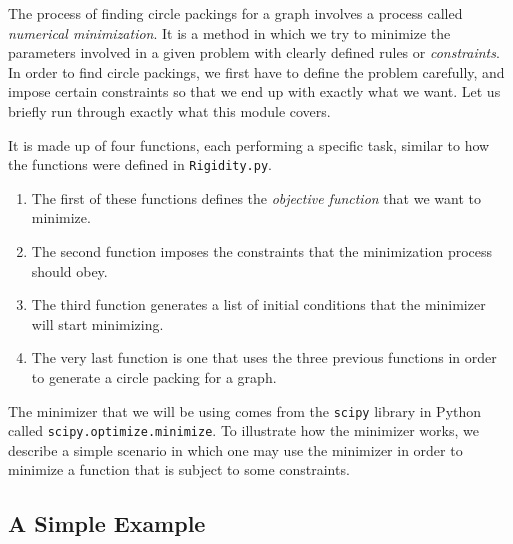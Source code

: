 \begin{flushleft}
The process of finding circle packings for a graph involves a process called \textit{numerical minimization}. It is a method in which we try to minimize the parameters involved in a given problem with clearly defined rules or \textit{constraints}. In order to find circle packings, we first have to define the problem carefully, and impose certain constraints so that we end up with exactly what we want. Let us briefly run through exactly what this module covers. 
\end{flushleft}

\begin{flushleft}
It is made up of four functions, each performing a specific task, similar to how the functions were defined in \texttt{Rigidity.py}. 
\begin{enumerate}
    \item The first of these functions defines the \textit{objective function} that we want to minimize.
    \vspace{-3mm}
    \item The second function imposes the constraints that the minimization process should obey. 
    \vspace{-3mm}
    \item The third function generates a list of initial conditions that the minimizer will start minimizing.
    \vspace{-3mm}
    \item The very last function is one that uses the three previous functions in order to generate a circle packing for a graph.
\end{enumerate}
\end{flushleft}

\begin{flushleft}
The minimizer that we will be using comes from the \texttt{scipy} \cite{scipy} library in Python called \texttt{scipy.optimize.minimize}. To illustrate how the minimizer works, we describe a simple scenario in which one may use the minimizer in order to minimize a function that is subject to some constraints.
\end{flushleft}

\subsection{A Simple Example}

